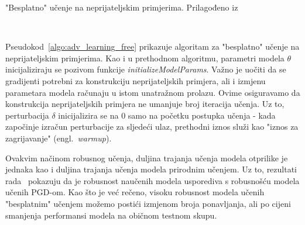 \documentclass[times, utf8, zavrsni, numeric]{fer}
\newcommand{\pluseq}{\mathrel{+}=}
\begin{document}
\begin{algorithm}[H]
    \caption{"Besplatno" učenje na neprijateljskim primjerima. Prilagođeno iz~\cite{wong2020fast}}
    \label{algo:adv_learning_free}
    \begin{algorithmic}
        \\\hrulefill
                    \STATE{$gradAdv, grad \pluseq \nabla_{x_i, \theta} L(x_{i} + \delta,y_{i};\theta)$}
                \ENDFOR
            \ENDFOR
        \ENDFOR
    \end{algorithmic}
\end{algorithm}

Pseudokod~\ref{algo:adv_learning_free} prikazuje algoritam za "besplatno" učenje na neprijateljskim primjerima.
Kao i u prethodnom algoritmu, parametri modela $\theta$ inicijaliziraju se pozivom funkcije \textit{initializeModelParams}.
Važno je uočiti da se gradijenti potrebni za konstrukciju neprijateljskih primjera, ali i izmjenu parametara modela računaju u istom unatražnom prolazu.
Ovime osiguravamo da konstrukcija neprijateljskih primjera ne umanjuje broj iteracija učenja. 
Uz to, perturbacija $\delta$ inicijalizira se na 0 samo na početku postupka učenja - kada započinje izračun perturbacije za sljedeći ulaz, prethodni iznos služi kao "iznos za zagrijavanje" (engl.\ \textit{warmup}).

Ovakvim načinom robusnog učenja, duljina trajanja učenja modela otprilike je jednaka kao i duljina trajanja učenja modela prirodnim učenjem.
Uz to, rezultati rada~\cite{shafahi2019adversarial} pokazuju da je robusnost naučenih modela usporediva s robusnošću modela učenih PGD-om.
Kao što je već rečeno, visoku robusnost modela učenih "besplatnim" učenjem možemo postići izmjenom broja ponavljanja, ali po cijeni smanjenja performansi modela na običnom testnom skupu.
\end{document}
